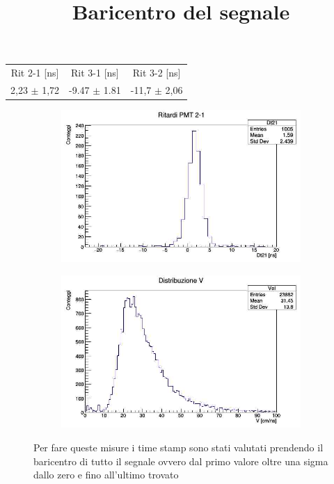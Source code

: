 \documentclass[a4paper]{article}
\begin{document}
\begin{tabular}{c|c|c}
Rit 2-1 [ns] & Rit 3-1 [ns] & Rit 3-2 [ns] \\
\hfill
2,23 $\pm$ 1,72 & -9.47 $\pm$ 1.81 & -11,7 $\pm$ 2,06
\hfill
\label{tab:RitIntNegSlo}
\end{tabular}

\begin{figure}[H]
     \centering
     \title{Baricentro del segnale}
     \begin{center}
     \begin{subfigure}[b]{0.4\textwidth}
         \centering
         \includegraphics[width=\textwidth]{./immagini/TimeOfFlight/Rit21IntSinTot.jpg}
         \caption{}
         \label{fig:Dt21IntSigTot}
     \end{subfigure}
     \hfill
     \begin{subfigure}[b]{0.4\textwidth}
         \centering
         \includegraphics[width=\textwidth]{./immagini/TimeOfFlight/VIntSigTot.jpg}
         \caption{}
         \label{fig:VIntSinTot}
     \end{subfigure}
     \end{center}
     \caption{Per fare queste misure i time stamp sono stati valutati prendendo il baricentro di tutto il segnale ovvero dal primo valore oltre una sigma dallo zero e fino all'ultimo trovato}        
     \label{fig:IntSinTot}
\end{figure}
\end{document}

